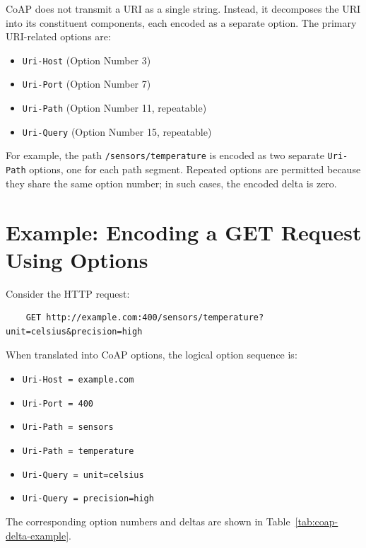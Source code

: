 \documentclass{scrbook}
\begin{document}
CoAP does not transmit a URI as a single string. Instead, it decomposes the URI into its constituent components, each encoded as a separate option. The primary URI-related options are:

\begin{itemize}
    \item \texttt{Uri-Host} (Option Number 3)
    \item \texttt{Uri-Port} (Option Number 7)
    \item \texttt{Uri-Path} (Option Number 11, repeatable)
    \item \texttt{Uri-Query} (Option Number 15, repeatable)
\end{itemize}

For example, the path \texttt{/sensors/temperature} is encoded as two separate \texttt{Uri-Path} options, one for each path segment. Repeated options are permitted because they share the same option number; in such cases, the encoded delta is zero. 

\section{Example: Encoding a GET Request Using Options}

Consider the HTTP request:

\begin{verbatim}
    GET http://example.com:400/sensors/temperature?unit=celsius&precision=high
\end{verbatim}

When translated into CoAP options, the logical option sequence is:

\begin{itemize}
    \item \texttt{Uri-Host = example.com}
    \item \texttt{Uri-Port = 400}
    \item \texttt{Uri-Path = sensors}
    \item \texttt{Uri-Path = temperature}
    \item \texttt{Uri-Query = unit=celsius}
    \item \texttt{Uri-Query = precision=high}
\end{itemize}

The corresponding option numbers and deltas are shown in Table~\ref{tab:coap-delta-example}.
\end{document}
